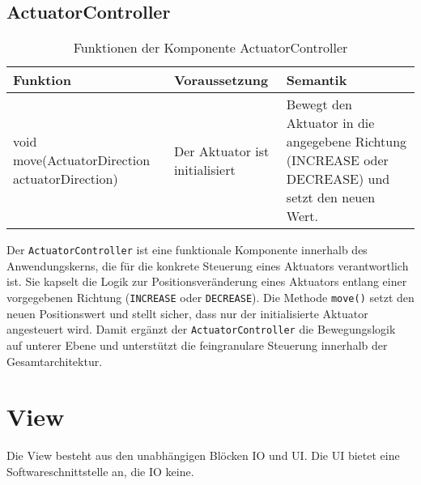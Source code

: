     \subsection{ActuatorController}
        \begin{table}[h!]
            \centering
            \begin{tabular}{|p{5cm}|p{5cm}|p{5cm}|}
                \hline
                \textbf{Funktion} & \textbf{Voraussetzung} & \textbf{Semantik} \\
                \hline
                void move(ActuatorDirection actuatorDirection) & Der Aktuator ist initialisiert & Bewegt den Aktuator in die angegebene Richtung (INCREASE oder DECREASE) und setzt den neuen Wert. \\
                \hline
            \end{tabular}
            \caption{Funktionen der Komponente ActuatorController}
            \label{tab:ActuatorController}
        \end{table}
Der \texttt{ActuatorController} ist eine funktionale Komponente innerhalb des Anwendungskerns, die für die konkrete Steuerung eines Aktuators verantwortlich ist. 
Sie kapselt die Logik zur Positionsveränderung eines Aktuators entlang einer vorgegebenen Richtung (\texttt{INCREASE} oder \texttt{DECREASE}). Die Methode \texttt{move()} setzt den neuen Positionswert und stellt sicher, dass nur der initialisierte Aktuator angesteuert wird. 
Damit ergänzt der \texttt{ActuatorController} die Bewegungslogik auf unterer Ebene und unterstützt die feingranulare Steuerung innerhalb der Gesamtarchitektur.

\section{View}
Die View besteht aus den unabhängigen Blöcken IO und UI. Die UI bietet eine Softwareschnittstelle an, die IO keine.

